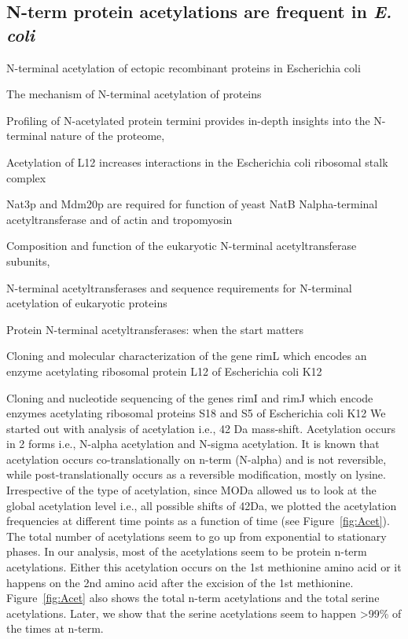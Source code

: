 \documentclass[12pt]{article}
\begin{document}
\subsection{N-term protein acetylations are frequent in \emph{E. coli}}
\cite{Charbautetal2002}
{N-terminal acetylation of ectopic recombinant proteins in Escherichia coli}

\cite{Driessenetal1985}
{The mechanism of N-terminal acetylation of proteins}

\cite{Helbigetal2010}
{Profiling of N-acetylated protein termini provides in-depth insights into the N-terminal nature of the proteome},

\cite{Gordiyenkoetal2008}
 {Acetylation of L12 increases interactions in the Escherichia coli ribosomal stalk complex}
 
\cite{Polevodaetal2003}
{Nat3p and Mdm20p are required for function of yeast NatB Nalpha-terminal acetyltransferase and of actin and tropomyosin}
   
\cite{PolevodaSherman2003}
{Composition and function of the eukaryotic N-terminal acetyltransferase subunits},
   
\cite{PolevodaSherman2003b}
{N-terminal acetyltransferases and sequence requirements for N-terminal acetylation of eukaryotic proteins}

\cite{Starheimetal2012}
{Protein N-terminal acetyltransferases: when the start matters}

\cite{Tanakaetal1989}
{Cloning and molecular characterization of the gene rimL which encodes an enzyme acetylating ribosomal protein L12 of Escherichia coli K12}

\cite{Yoshikawaetal1987}
{Cloning and nucleotide sequencing of the genes rimI and rimJ which encode enzymes acetylating ribosomal proteins S18 and S5 of Escherichia coli K12}
We started out with analysis of acetylation i.e., 42 Da mass-shift. Acetylation occurs in 2 forms i.e., N-{alpha} acetylation and N-{sigma} acetylation. It is known that acetylation occurs co-translationally on n-term (N-{alpha}) and is not reversible, while post-translationally occurs as a reversible modification, mostly on lysine. Irrespective of the type of acetylation, since MODa allowed us to look at the global acetylation level i.e., all possible shifts of 42Da, we plotted the acetylation frequencies at different time points as a function of time (see Figure~\ref{fig:Acet}). The total number of acetylations seem to go up from exponential to stationary phases. In our analysis, most of the acetylations seem to be protein n-term acetylations. Either this acetylation occurs on the 1st methionine amino acid or it happens on the 2nd amino acid after the excision of the 1st methionine. Figure~\ref{fig:Acet} also shows the total n-term acetylations and the total serine acetylations. Later, we show that the serine acetylations seem to happen >99\% of the times at n-term.
\end{document}
